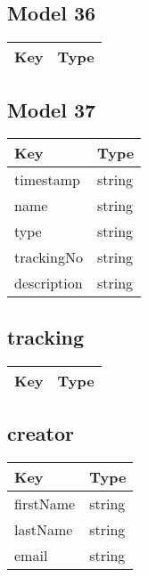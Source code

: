 \documentclass[10pt]{article}
\begin{document}
            \subsection{Model 36}
            
            \begin{tabularx}{\textwidth}{lZ}
                \textbf{Key} & \textbf{Type} \\
                \hline
            \end{tabularx}
            \subsection{Model 37}
            
            \begin{tabularx}{\textwidth}{lZ}
                \textbf{Key} & \textbf{Type} \\
                \hline
                    timestamp & string \\
                    name & string \\
                    type & string \\
                    trackingNo & string \\
                    description & string \\
            \end{tabularx}
            \subsection{tracking}
            
            \begin{tabularx}{\textwidth}{lZ}
                \textbf{Key} & \textbf{Type} \\
                \hline
            \end{tabularx}
            \subsection{creator}
            
            \begin{tabularx}{\textwidth}{lZ}
                \textbf{Key} & \textbf{Type} \\
                \hline
                    firstName & string \\
                    lastName & string \\
                    email & string \\
            \end{tabularx}
\end{document}
